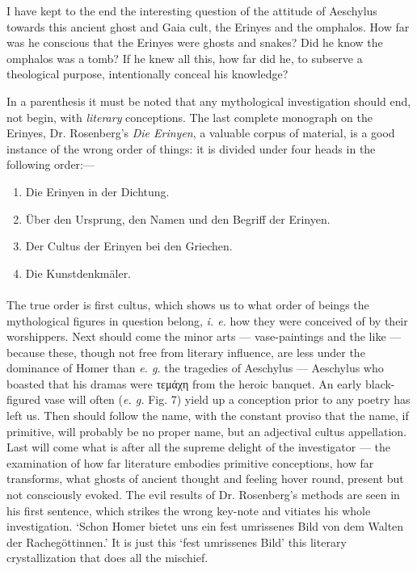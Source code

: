 \documentclass[a4paper, 11pt, oneside, polutonikogreek, english]{article}
\begin{document}
I have kept to the end the interesting question of the attitude of Aeschylus towards this ancient ghost and Gaia cult, the Erinyes and the omphalos. How far was he conscious that the Erinyes were ghosts and snakes? Did he know the omphalos was a tomb? If he knew all this, how far did he, to subserve a theological purpose, intentionally conceal his knowledge?

In a parenthesis it must be noted that any mythological investigation should end, not begin, with \emph{literary} conceptions. The last complete monograph on the Erinyes, Dr. Rosenberg's \emph{Die Erinyen}, a valuable corpus of material, is a good instance of the wrong order of things: it is divided under four heads in the following order:---
\begin{enumerate}
    \item Die Erinyen in der Dichtung.

    \item Über den Ursprung, den Namen und den Begriff der Erinyen.

    \item Der Cultus der Erinyen bei den Griechen.

    \item Die Kunstdenkmäler.
\end{enumerate}
\paragraph{}
The true order is first cultus, which shows us to what order of beings the mythological figures in question belong, \emph{i. e.} how they were conceived of by their worshippers. Next should come the minor arts --- vase-paintings and the like --- because these, though not free from literary influence, are less under the dominance of Homer than \emph{e. g.} the tragedies of Aeschylus --- Aeschylus who boasted that his dramas were τεμάχη from the heroic banquet. An early black-figured vase will often (\emph{e. g.} Fig. 7) yield up a conception prior to any poetry has left us. Then should follow the name, with the constant proviso that the name, if primitive, will probably be no proper name, but an adjectival cultus appellation. Last will come what is after all the supreme delight of the investigator --- the examination of how far literature embodies primitive conceptions, how far transforms, what ghosts of ancient thought and feeling hover round, present but not consciously evoked. The evil results of Dr. Rosenberg's methods are seen in his first sentence, which strikes the wrong key-note and vitiates his whole investigation. `Schon Homer bietet uns ein fest umrissenes Bild von dem Walten der Rachegöttinnen.' It is just this `fest umrissenes Bild' this literary crystallization that does all the mischief.
\end{document}
